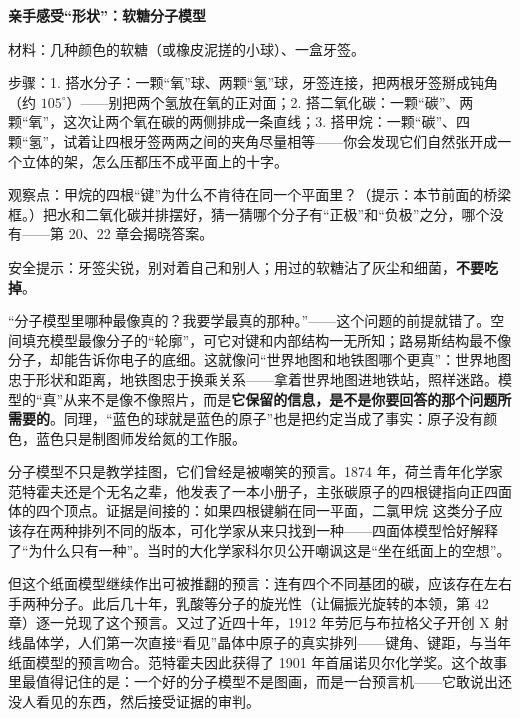 \begin{shiyan}
\textbf{亲手感受“形状”：软糖分子模型}

材料：几种颜色的软糖（或橡皮泥搓的小球）、一盒牙签。

步骤：1. 搭水分子：一颗“氧”球、两颗“氢”球，牙签连接，把两根牙签掰成钝角（约 $105^{\circ}$）——别把两个氢放在氧的正对面；2. 搭二氧化碳：一颗“碳”、两颗“氧”，这次让两个氧在碳的两侧排成一条直线；3. 搭甲烷：一颗“碳”、四颗“氢”，试着让四根牙签两两之间的夹角尽量相等——你会发现它们自然张开成一个立体的架，怎么压都压不成平面上的十字。

观察点：甲烷的四根“键”为什么不肯待在同一个平面里？（提示：本节前面的桥梁框。）把水和二氧化碳并排摆好，猜一猜哪个分子有“正极”和“负极”之分，哪个没有——第 20、22 章会揭晓答案。

安全提示：牙签尖锐，别对着自己和别人；用过的软糖沾了灰尘和细菌，\textbf{不要吃掉}。
\end{shiyan}

\begin{wuqu}
“分子模型里哪种最像真的？我要学最真的那种。”——这个问题的前提就错了。空间填充模型最像分子的“轮廓”，可它对键和内部结构一无所知；路易斯结构最不像分子，却能告诉你电子的底细。这就像问“世界地图和地铁图哪个更真”：世界地图忠于形状和距离，地铁图忠于换乘关系——拿着世界地图进地铁站，照样迷路。模型的“真”从来不是像不像照片，而是\textbf{它保留的信息，是不是你要回答的那个问题所需要的}。同理，“蓝色的球就是蓝色的原子”也是把约定当成了事实：原子没有颜色，蓝色只是制图师发给氮的工作服。
\end{wuqu}

\begin{zhengju}
分子模型不只是教学挂图，它们曾经是被嘲笑的预言。1874 年，荷兰青年化学家范特霍夫还是个无名之辈，他发表了一本小册子，主张碳原子的四根键指向正四面体的四个顶点。证据是间接的：如果四根键躺在同一平面，二氯甲烷  这类分子应该存在两种排列不同的版本，可化学家从来只找到一种——四面体模型恰好解释了“为什么只有一种”。当时的大化学家科尔贝公开嘲讽这是“坐在纸面上的空想”。

但这个纸面模型继续作出可被推翻的预言：连有四个不同基团的碳，应该存在左右手两种分子。此后几十年，乳酸等分子的旋光性（让偏振光旋转的本领，第 42 章）逐一兑现了这个预言。又过了近四十年，1912 年劳厄与布拉格父子开创 X 射线晶体学，人们第一次直接“看见”晶体中原子的真实排列——键角、键距，与当年纸面模型的预言吻合。范特霍夫因此获得了 1901 年首届诺贝尔化学奖。这个故事里最值得记住的是：一个好的分子模型不是图画，而是一台预言机——它敢说出还没人看见的东西，然后接受证据的审判。
\end{zhengju}

